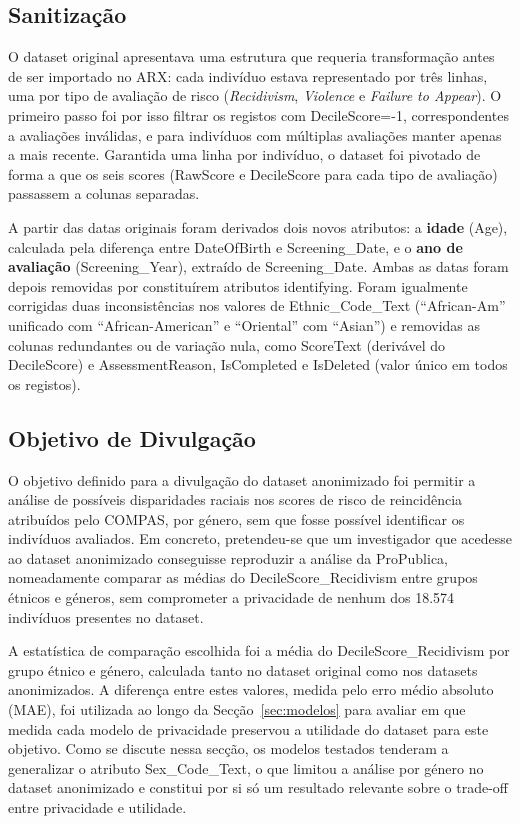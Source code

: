 \subsection{Sanitização}
\label{sec:sanitizacao}

O dataset original apresentava uma estrutura que requeria transformação antes de ser importado no ARX: cada indivíduo estava representado por três linhas, uma por tipo de avaliação de risco (\textit{Recidivism}, \textit{Violence} e \textit{Failure to Appear}). O primeiro passo foi por isso filtrar os registos com DecileScore=-1, correspondentes a avaliações inválidas, e para indivíduos com múltiplas avaliações manter apenas a mais recente. Garantida uma linha por indivíduo, o dataset foi pivotado de forma a que os seis scores (RawScore e DecileScore para cada tipo de avaliação) passassem a colunas separadas.

A partir das datas originais foram derivados dois novos atributos: a \textbf{idade} (Age), calculada pela diferença entre DateOfBirth e Screening\_Date, e o \textbf{ano de avaliação} (Screening\_Year), extraído de Screening\_Date. Ambas as datas foram depois removidas por constituírem atributos identifying. Foram igualmente corrigidas duas inconsistências nos valores de Ethnic\_Code\_Text (``African-Am'' unificado com ``African-American'' e ``Oriental'' com ``Asian'') e removidas as colunas redundantes ou de variação nula, como ScoreText (derivável do DecileScore) e AssessmentReason, IsCompleted e IsDeleted (valor único em todos os registos).

\subsection{Objetivo de Divulgação}
\label{sec:objetivo}

O objetivo definido para a divulgação do dataset anonimizado foi permitir a análise de possíveis disparidades raciais nos scores de risco de reincidência atribuídos pelo COMPAS, por género, sem que fosse possível identificar os indivíduos avaliados. Em concreto, pretendeu-se que um investigador que acedesse ao dataset anonimizado conseguisse reproduzir a análise da ProPublica, nomeadamente comparar as médias do DecileScore\_Recidivism entre grupos étnicos e géneros, sem comprometer a privacidade de nenhum dos 18.574 indivíduos presentes no dataset.

A estatística de comparação escolhida foi a média do DecileScore\_Recidivism por grupo étnico e género, calculada tanto no dataset original como nos datasets anonimizados. A diferença entre estes valores, medida pelo erro médio absoluto (MAE), foi utilizada ao longo da Secção~\ref{sec:modelos} para avaliar em que medida cada modelo de privacidade preservou a utilidade do dataset para este objetivo. Como se discute nessa secção, os modelos testados tenderam a generalizar o atributo Sex\_Code\_Text, o que limitou a análise por género no dataset anonimizado e constitui por si só um resultado relevante sobre o trade-off entre privacidade e utilidade.

